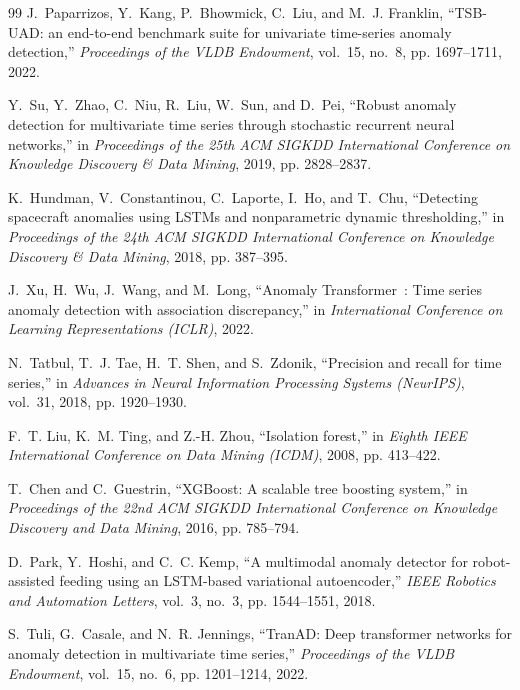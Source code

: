 \documentclass[11pt,journal,onecolumn]{IEEEtran}
\begin{document}
\begin{thebibliography}{99}
J.~Paparrizos, Y.~Kang, P.~Bhowmick, C.~Liu, and M.~J. Franklin, ``TSB-UAD: an end-to-end benchmark suite for univariate time-series anomaly detection,'' \emph{Proceedings of the VLDB Endowment}, vol.~15, no.~8, pp. 1697--1711, 2022.

Y.~Su, Y.~Zhao, C.~Niu, R.~Liu, W.~Sun, and D.~Pei, ``Robust anomaly detection for multivariate time series through stochastic recurrent neural networks,'' in \emph{Proceedings of the 25th ACM SIGKDD International Conference on Knowledge Discovery \& Data Mining}, 2019, pp. 2828--2837.

K.~Hundman, V.~Constantinou, C.~Laporte, I.~Ho, and T.~Chu, ``Detecting spacecraft anomalies using LSTMs and nonparametric dynamic thresholding,'' in \emph{Proceedings of the 24th ACM SIGKDD International Conference on Knowledge Discovery \& Data Mining}, 2018, pp. 387--395.

J.~Xu, H.~Wu, J.~Wang, and M.~Long, ``Anomaly Transformer~\cite{xu2022anomaly}: Time series anomaly detection with association discrepancy,'' in \emph{International Conference on Learning Representations (ICLR)}, 2022.

N.~Tatbul, T.~J. Tae, H.~T. Shen, and S.~Zdonik, ``Precision and recall for time series,'' in \emph{Advances in Neural Information Processing Systems (NeurIPS)}, vol.~31, 2018, pp. 1920--1930.

F.~T. Liu, K.~M. Ting, and Z.-H. Zhou, ``Isolation forest,'' in \emph{Eighth IEEE International Conference on Data Mining (ICDM)}, 2008, pp. 413--422.

T.~Chen and C.~Guestrin, ``XGBoost: A scalable tree boosting system,'' in \emph{Proceedings of the 22nd ACM SIGKDD International Conference on Knowledge Discovery and Data Mining}, 2016, pp. 785--794.

D.~Park, Y.~Hoshi, and C.~C. Kemp, ``A multimodal anomaly detector for robot-assisted feeding using an LSTM-based variational autoencoder,'' \emph{IEEE Robotics and Automation Letters}, vol.~3, no.~3, pp. 1544--1551, 2018.

S.~Tuli, G.~Casale, and N.~R. Jennings, ``TranAD: Deep transformer networks for anomaly detection in multivariate time series,'' \emph{Proceedings of the VLDB Endowment}, vol.~15, no.~6, pp. 1201--1214, 2022.


\end{thebibliography}
\end{document}
